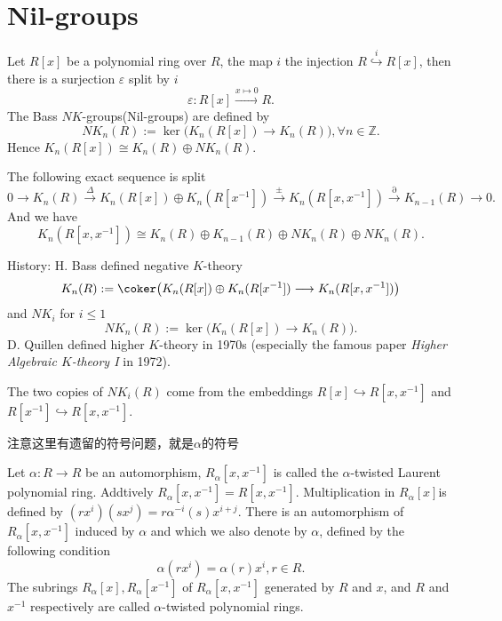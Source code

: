 \section{Nil-groups}
\begin{definition}
	Let $R[x]$ be a polynomial ring over $R$, the map $i$ the injection $R \overset{i}\hookrightarrow R[x]$, then there is a surjection $\varepsilon$ split by $i$
	\[\varepsilon \colon R[x] \overset{x \mapsto 0}\longrightarrow R.\]
	The Bass $NK$-groups(Nil-groups) are defined by 
	\[NK_n(R):=\ker \big(K_n(R[x])\longrightarrow K_n(R) \big), \forall n\in \mathbb{Z}.\]
	Hence $K_n(R[x]) \cong K_n(R)\oplus NK_n(R)$.
\end{definition}
\begin{theorem}
	The following exact sequence is split
	\[0\longrightarrow K_n(R) \overset{\Delta}\longrightarrow K_n(R[x])\oplus K_n(R[x^{-1}]) \overset{\pm}\longrightarrow K_n(R[x,x^{-1}]) \overset{\partial}\longrightarrow K_{n-1}(R) \longrightarrow 0.\]
	And we have 
	\[K_n(R[x,x^{-1}])\cong K_n(R)\oplus K_{n-1}(R) \oplus NK_n(R)\oplus NK_n(R).\]
\end{theorem}
\begin{remark}
	History: H. Bass defined negative $K$-theory
	\[K_n(R):= \coker\big( K_n(R[x])\oplus K_n(R[x^{-1}]) \longrightarrow K_n(R[x,x^{-1}]) \big)\]
	and $NK_i$ for $i\leq 1$ 
	\[NK_n(R):=\ker \big(K_n(R[x])\longrightarrow K_n(R) \big).\]
	D. Quillen defined higher $K$-theory in 1970s (especially the famous paper \emph{ Higher Algebraic $K$-theory I}\cite{MR49:2895} in 1972).

	The two copies of $NK_i(R)$ come from the embeddings $R[x]\hookrightarrow R[x,x^{-1}]$ and $R[x^{-1}]\hookrightarrow R[x,x^{-1}]$.
\end{remark}
{\color{red}注意这里有遗留的符号问题，就是$\alpha$的符号}
\begin{definition}
	Let $\alpha \colon R \longrightarrow R$ be an automorphism, $R_\alpha[x,x^{-1}]$ is called the $\alpha$-twisted Laurent polynomial ring. Addtively $R_\alpha[x,x^{-1}]=R[x,x^{-1}]$. Multiplication in $R_\alpha[x]$is defined by $(rx^i)(sx^j)=r\alpha^{-i}(s)x^{i+j}$. There is an automorphism of $R_\alpha[x,x^{-1}]$  induced by $\alpha$ and which we also denote by $\alpha$, defined by the following condition
	\[\alpha(rx^i)=\alpha(r)x^i, r\in R.\] 
	The subrings $R_\alpha[x],R_\alpha[x^{-1}]$ of $R_\alpha[x,x^{-1}]$ generated by $R$ and $x$, and $R$ and $x^{-1}$ respectively are called $\alpha$-twisted polynomial rings.
\end{definition}
